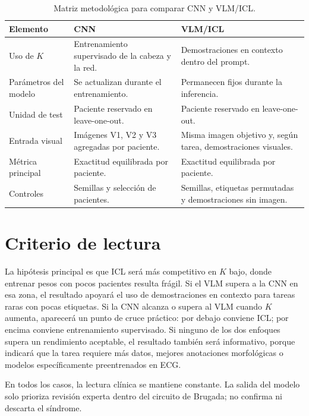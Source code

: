 \begin{table}[H]
  \centering
  \small
  \begin{tabularx}{\textwidth}{p{3.3cm}XX}
    \toprule
    Elemento & CNN & VLM/ICL \\
    \midrule
    Uso de \(K\) & Entrenamiento supervisado de la cabeza y la red. & Demostraciones en contexto dentro del prompt. \\
    Parámetros del modelo & Se actualizan durante el entrenamiento. & Permanecen fijos durante la inferencia. \\
    Unidad de test & Paciente reservado en leave-one-out. & Paciente reservado en leave-one-out. \\
    Entrada visual & Imágenes V1, V2 y V3 agregadas por paciente. & Misma imagen objetivo y, según tarea, demostraciones visuales. \\
    Métrica principal & Exactitud equilibrada por paciente. & Exactitud equilibrada por paciente. \\
    Controles & Semillas y selección de pacientes. & Semillas, etiquetas permutadas y demostraciones sin imagen. \\
    \bottomrule
  \end{tabularx}
  \caption{Matriz metodológica para comparar CNN y VLM/ICL.}
  \label{tab:cnn_vlm_method_matrix}
\end{table}

\section{Criterio de lectura}

La hipótesis principal es que ICL será más competitivo en \(K\) bajo, donde entrenar pesos con pocos pacientes resulta frágil. Si el VLM supera a la CNN en esa zona, el resultado apoyará el uso de demostraciones en contexto para tareas raras con pocas etiquetas. Si la CNN alcanza o supera al VLM cuando \(K\) aumenta, aparecerá un punto de cruce práctico: por debajo conviene ICL; por encima conviene entrenamiento supervisado. Si ninguno de los dos enfoques supera un rendimiento aceptable, el resultado también será informativo, porque indicará que la tarea requiere más datos, mejores anotaciones morfológicas o modelos específicamente preentrenados en ECG.

En todos los casos, la lectura clínica se mantiene constante. La salida del modelo solo prioriza revisión experta dentro del circuito de Brugada; no confirma ni descarta el síndrome.

